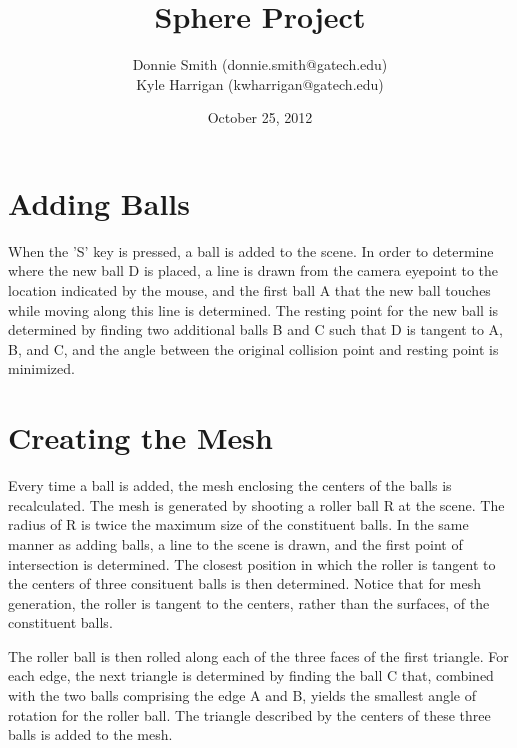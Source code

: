 \documentclass[letterpaper,10pt]{IEEEtran}
\title{Sphere Project}
\author{
Donnie Smith (donnie.smith@gatech.edu) \\
Kyle Harrigan (kwharrigan@gatech.edu) 
}
\date{October 25, 2012}                                           %
\begin{document}


\maketitle

 
 
 


%

\section{Adding Balls}
When the 'S' key is pressed, a ball is added to the scene.
In order to determine where the new ball D is placed, a line is drawn from the camera eyepoint to the location indicated by the mouse, and the first ball A that the new ball touches while moving along this line is determined.
The resting point for the new ball is determined by finding two additional balls B and C such that D is tangent to A, B, and C, and the angle between the original collision point and resting point is minimized.

\section{Creating the Mesh}
Every time a ball is added, the mesh enclosing the centers of the balls is recalculated.
The mesh is generated by shooting a roller ball R at the scene.
The radius of R is twice the maximum size of the constituent balls.
In the same manner as adding balls, a line to the scene is drawn, and the first point of intersection is determined.
The closest position in which the roller is tangent to the centers of three consituent balls is then determined.
Notice that for mesh generation, the roller is tangent to the centers, rather than the surfaces, of the constituent balls.

The roller ball is then rolled along each of the three faces of the first triangle.
For each edge, the next triangle is determined by finding the ball C that, combined with the two balls comprising the edge A and B, yields the smallest angle of rotation for the roller ball.
The triangle described by the centers of these three balls is added to the mesh.
\end{document}
